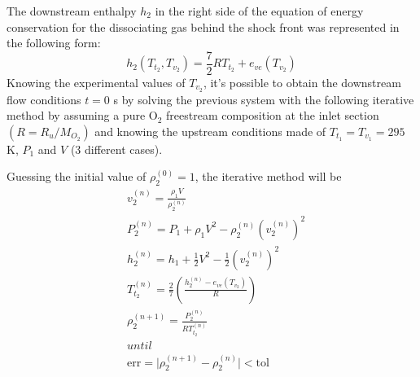 \documentclass[10pt]{beamer}
\begin{document}
\begin{frame}
The downstream enthalpy $h_2$ in the right side of the equation of energy
conservation for the dissociating gas behind the shock front was represented in
the following form:
\begin{equation*}
h_2(T_{t_2},T_{v_2})=\frac{7}{2}RT_{t_2}+e_{ve}(T_{v_2})
\end{equation*}
Knowing the experimental values of $T_{v_2}$, it's possible to obtain the downstream flow conditions $t=0$ s by solving the previous system with the following iterative method by assuming a pure O$_2$ freestream composition at the inlet section $\left(R=R_u/M_{O_2}\right)$ and knowing the upstream conditions made of $T_{t_1}=T_{v_1}=295$ K, $P_1$ and $V$ (3 different cases).
\end{frame}

\begin{frame}
Guessing the initial value of $\rho_2^{(0)}=1$, the iterative method will be
\begin{align*}
& v_2^{(n)}=\frac{\rho_1V}{\rho_2^{(n)}} \\
& P_2^{(n)}=P_1+\rho_1V^2-\rho_2^{(n)}\left(v_2^{(n)}\right)^2 \\
& h_2^{(n)}=h_1+\frac{1}{2}V^2-\frac{1}{2}\left(v_2^{(n)}\right)^2 \\
& T_{t_2}^{(n)}=\frac{2}{7}\left(\frac{h_2^{(n)}-e_{ve}(T_{v_2})}{R}\right) \\
& \rho_2^{(n+1)}=\frac{P_2^{(n)}}{RT_{t_2}^{(n)}} \\
& until \\
& \text{err}=\Big|\rho_2^{(n+1)}-\rho_2^{(n)}\Big|<\text{tol}
\end{align*}
\end{frame}
\end{document}
